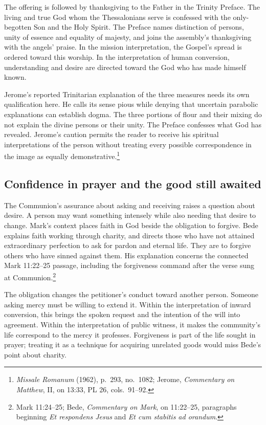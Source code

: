 The offering is followed by thanksgiving to the Father in the Trinity Preface. The living and true God whom the Thessalonians serve is confessed with the only-begotten Son and the Holy Spirit. The Preface names distinction of persons, unity of essence and equality of majesty, and joins the assembly's thanksgiving with the angels' praise. In the mission interpretation, the Gospel's spread is ordered toward this worship. In the interpretation of human conversion, understanding and desire are directed toward the God who has made himself known.

Jerome's reported Trinitarian explanation of the three measures needs its own qualification here. He calls its sense pious while denying that uncertain parabolic explanations can establish dogma. The three portions of flour and their mixing do not explain the divine persons or their unity. The Preface confesses what God has revealed. Jerome's caution permits the reader to receive his spiritual interpretations of the person without treating every possible correspondence in the image as equally demonstrative.\footnote{\textit{Missale Romanum} (1962), p.~293, no.~1082; Jerome, \textit{Commentary on Matthew}, II, on 13:33, PL 26, cols.~91--92.}

\subsection{Confidence in prayer and the good still awaited}

The Communion's assurance about asking and receiving raises a question about desire. A person may want something intensely while also needing that desire to change. Mark's context places faith in God beside the obligation to forgive. Bede explains faith working through charity, and directs those who have not attained extraordinary perfection to ask for pardon and eternal life. They are to forgive others who have sinned against them. His explanation concerns the connected Mark 11:22--25 passage, including the forgiveness command after the verse sung at Communion.\footnote{Mark 11:24--25; Bede, \textit{Commentary on Mark}, on 11:22--25, paragraphs beginning \textit{Et respondens Jesus} and \textit{Et cum stabitis ad orandum}.}

The obligation changes the petitioner's conduct toward another person. Someone asking mercy must be willing to extend it. Within the interpretation of inward conversion, this brings the spoken request and the intention of the will into agreement. Within the interpretation of public witness, it makes the community's life correspond to the mercy it professes. Forgiveness is part of the life sought in prayer; treating it as a technique for acquiring unrelated goods would miss Bede's point about charity.

